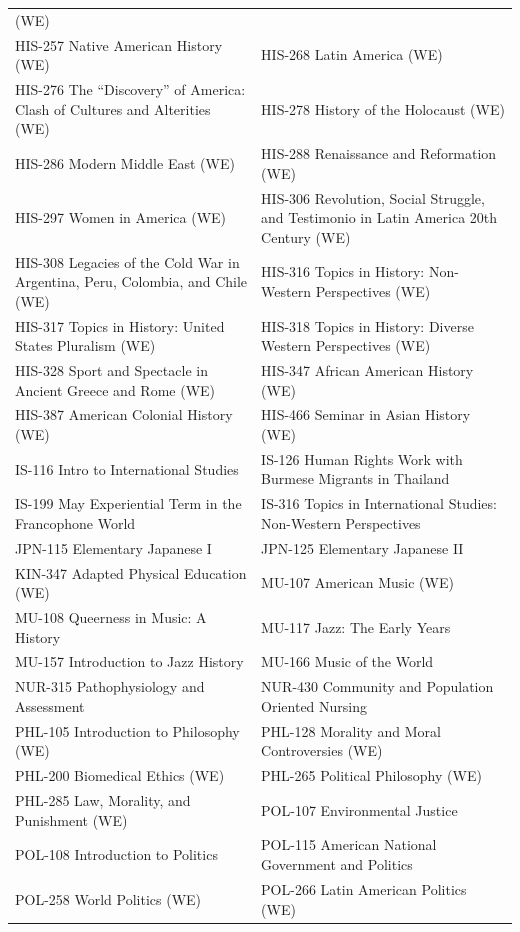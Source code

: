 \documentclass[
  letterpaper,
]{scrbook}
\begin{document}
{\begin{longtable}[]{@{}
  >{\raggedright\arraybackslash}p{}
  >{\raggedright\arraybackslash}p{}@{}}
(WE) \\
HIS-257 Native American History (WE) & HIS-268 Latin America (WE) \\
HIS-276 The ``Discovery'' of America: Clash of Cultures and Alterities
(WE) & HIS-278 History of the Holocaust (WE) \\
HIS-286 Modern Middle East (WE) & HIS-288 Renaissance and Reformation
(WE) \\
HIS-297 Women in America (WE) & HIS-306 Revolution, Social Struggle, and
Testimonio in Latin America 20th Century (WE) \\
HIS-308 Legacies of the Cold War in Argentina, Peru, Colombia, and Chile
(WE) & HIS-316 Topics in History: Non-Western Perspectives (WE) \\
HIS-317 Topics in History: United States Pluralism (WE) & HIS-318 Topics
in History: Diverse Western Perspectives (WE) \\
HIS-328 Sport and Spectacle in Ancient Greece and Rome (WE) & HIS-347
African American History (WE) \\
HIS-387 American Colonial History (WE) & HIS-466 Seminar in Asian
History (WE) \\
IS-116 Intro to International Studies & IS-126 Human Rights Work with
Burmese Migrants in Thailand \\
IS-199 May Experiential Term in the Francophone World & IS-316 Topics in
International Studies: Non-Western Perspectives \\
JPN-115 Elementary Japanese I & JPN-125 Elementary Japanese II \\
KIN-347 Adapted Physical Education (WE) & MU-107 American Music (WE) \\
MU-108 Queerness in Music: A History & MU-117 Jazz: The Early Years \\
MU-157 Introduction to Jazz History & MU-166 Music of the World \\
NUR-315 Pathophysiology and Assessment & NUR-430 Community and
Population Oriented Nursing \\
PHL-105 Introduction to Philosophy (WE) & PHL-128 Morality and Moral
Controversies (WE) \\
PHL-200 Biomedical Ethics (WE) & PHL-265 Political Philosophy (WE) \\
PHL-285 Law, Morality, and Punishment (WE) & POL-107 Environmental
Justice \\
POL-108 Introduction to Politics & POL-115 American National Government
and Politics \\
POL-258 World Politics (WE) & POL-266 Latin American Politics (WE) \\

\end{longtable}}
\end{document}
